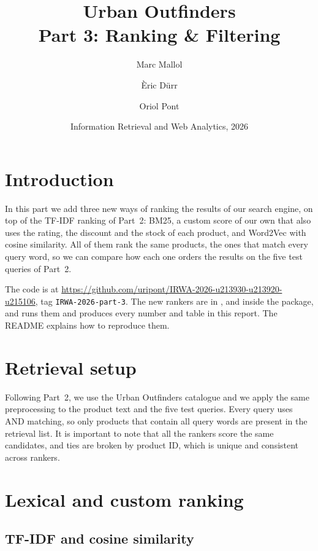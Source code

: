 \documentclass[11pt,a4paper]{article}
\title{Urban Outfinders\\[0.3em]\large Part 3: Ranking \& Filtering}
\author{Marc Mallol\and Èric Dürr\and Oriol Pont}
\date{Information Retrieval and Web Analytics, 2026}
\begin{document}
\maketitle

\section{Introduction}

In this part we add three new ways of ranking the results of our search engine, on top of the TF-IDF ranking of Part~2: BM25, a custom score of our own that also uses the rating, the discount and the stock of each product, and Word2Vec with cosine similarity. All of them rank the same products, the ones that match every query word, so we can compare how each one orders the results on the five test queries of Part~2.

The code is at \url{https://github.com/uripont/IRWA-2026-u213930-u213920-u215106}, tag \texttt{IRWA-2026-part-3}. The new rankers are in ,  and  inside the  package, and  runs them and produces every number and table in this report. The README explains how to reproduce them.

\section{Retrieval setup}

Following Part~2, we use the Urban Outfinders catalogue and we apply the same preprocessing to the product text and the five test queries.
Every query uses AND matching, so only products that contain all query words are present in the retrieval list.
It is important to note that all the rankers score the same candidates, and ties are broken by product ID, which is unique and consistent across rankers.


\section{Lexical and custom ranking}
\subsection{TF-IDF and cosine similarity}
\end{document}
